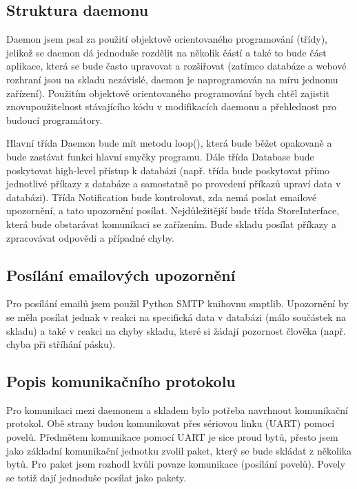 \documentclass[12pt, a4paper, oneside]{article}
\begin{document}
\subsection{Struktura daemonu}

Daemon jsem psal za použití objektově orientovaného programování (třídy), jelikož se daemon dá jednoduše rozdělit na několik částí a také to bude část aplikace, která se bude často upravovat a rozšiřovat (zatímco databáze a webové rozhraní jsou na skladu nezávislé, daemon je naprogramován na míru jednomu zařízení). Použitím objektově orientovaného programování bych chtěl zajistit znovupoužitelnost stávajícího kódu v modifikacích daemonu a přehlednost pro budoucí programátory.

Hlavní třída Daemon bude mít metodu loop(), která bude běžet opakovaně a bude zastávat funkci hlavní smyčky programu. Dále třída Database bude poskytovat high-level přístup k databázi (např. třída bude poskytovat přímo jednotlivé příkazy z databáze a samostatně po provedení příkazů upraví data v databázi). Třída Notification bude kontrolovat, zda nemá poslat emailové upozornění, a tato upozornění posílat. Nejdůležitější bude třída StoreInterface, která bude obstarávat komunikaci se zařízením. Bude skladu posílat příkazy a zpracovávat odpovědi a případné chyby.

\subsection{Posílání emailových upozornění}

Pro posílání emailů jsem použil Python SMTP knihovnu smptlib. Upozornění by se měla posílat jednak v reakci na specifická data v databázi (málo součástek na skladu) a také v reakci na chyby skladu, které si žádají pozornost člověka (např. chyba při stříhání pásku).

\subsection{Popis komunikačního protokolu}

Pro komunikaci mezi daemonem a skladem bylo potřeba navrhnout komunikační protokol. Obě strany budou komunikovat přes sériovou linku (UART) pomocí povelů. Předmětem komunikace pomocí UART je sice proud bytů, přesto jsem jako základní komunikační jednotku zvolil paket, který se bude skládat z několika bytů. Pro paket jsem rozhodl kvůli povaze komunikace (posílání povelů). Povely se totiž dají jednoduše posílat jako pakety.
\end{document}
